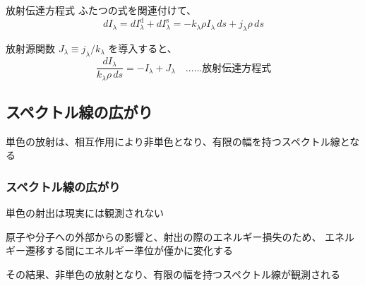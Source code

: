 \documentclass[unicode,colorlinks]{beamer}
\begin{document}
\begin{frame}{放射伝達方程式}
	ふたつの式を関連付けて、
	\[dI_\lambda=dI_\lambda^\mathrm{d}+dI_\lambda^\mathrm{s}=-k_\lambda\rho I_\lambda\,ds+j_\lambda\rho\,ds\]

	放射源関数 $J_\lambda\equiv j_\lambda/k_\lambda$ を導入すると、
	\[\frac{dI_\lambda}{k_\lambda\rho\,ds}=-I_\lambda+J_\lambda\quad\text{……放射伝達方程式}\]
\end{frame}

\begin{frame}
	\section{スペクトル線の広がり}
	単色の放射は、相互作用により非単色となり、有限の幅を持つスペクトル線となる
\end{frame}

\begin{frame}
	\frametitle{スペクトル線の広がり}
	単色の射出は現実には観測されない

	原子や分子への外部からの影響と、射出の際のエネルギー損失のため、
	エネルギー遷移する間にエネルギー準位が僅かに変化する

	その結果、非単色の放射となり、有限の幅を持つスペクトル線が観測される
\end{frame}
\end{document}
